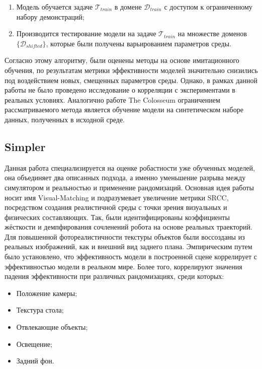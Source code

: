             \begin{enumerate}
                \item Модель обучается задаче $\mathcal{T}_{train}$ в домене $\mathcal{D}_{train}$ с доступом к ограниченному набору демонстраций;
                \item Производится тестирование модели на задаче $\mathcal{T}_{train}$ на множестве доменов $\{\mathcal{D}_{shifted}\}$, которые были получены варьированием параметров среды.
            \end{enumerate}
    
        Согласно этому алгоритму, были оценены методы на основе имитационного обучения, по результатам метрики эффективности моделей значительно снизились под воздействием новых, смещенных параметров среды. Однако, в рамках данной работы не было проведено исследование о корреляции с экспериментами в реальных условиях. Аналогично работе The Colosseum ограничением рассматриваемого метода является обучение модели на синтетическом наборе данных, полученных в исходной среде. 
    
        \subsection{Simpler}
    
            Данная работа \cite{li24simpler} специализируется на оценке робастности уже обученных моделей, она объединяет два описанных подхода, а именно уменьшение разрыва между симулятором и реальностью и применение рандомизаций. Основная идея работы носит имя Visual-Matching и подразумевает увеличение метрики SRCC, посредством создания реалистичной среды с точки зрения визуальных и физических составляющих. Так, были идентифицированы коэффициенты жёсткости и демпфирования сочленений робота на основе реальных траекторий. Для повышенной фотореалистичности текстуры объектов были воссозданы из реальных изображений, как и внешний вид заднего плана. Эмпирическим путем было установлено, что эффективность модели в построенной сцене коррелирует с эффективностью модели в реальном мире. Более того, коррелируют значения падения эффективности при различных рандомизациях, среди которых:~\begin{itemize}
                \item Положение камеры;
                \item Текстура стола;
                \item Отвлекающие объекты;
                \item Освещение;
                \item Задний фон.
            \end{itemize}
            
